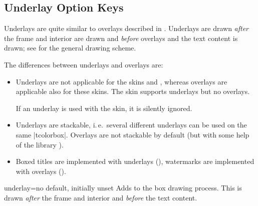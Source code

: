 \clearpage
\subsection{Underlay Option Keys}\label{subsec:skinunderlay}

Underlays are quite similar to overlays described in .
Underlays are drawn \emph{after} the frame and interior are
drawn and \emph{before} overlays and the text content is drawn; see
 for the general drawing scheme.

The differences between underlays and overlays are:
\begin{itemize}
\item Underlays are not applicable for the skins
   and
  ,
  whereas overlays are applicable also for these skins.
  The skin  supports underlays but no overlays.
  \begin{marker}
  If an underlay is used with the  skin, it is silently ignored.
  \end{marker}
\item Underlays are stackable, i.\,e.\ several different underlays can be
  used on the same |tcolorbox|. Overlays are not stackable by default (but with
  some help of the library ).
\item Boxed titles are implemented with underlays (),
  watermarks are implemented with overlays ().
\end{itemize}


\begin{docTcbKey}{underlay}{=}{no default, initially unset}
  Adds  to the box drawing process. This 
  is drawn \emph{after} the frame and interior and \emph{before} the text content.
\end{docTcbKey}


